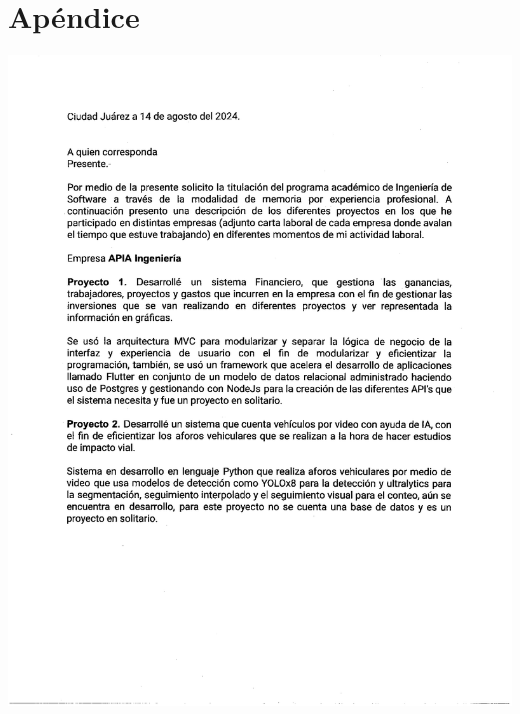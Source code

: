 \documentclass[final, fmstyle, 12pt]{article}
\begin{document}
\section{Apéndice}
\begin{center}
    
\includegraphics[scale=0.8]{Imagenes/Pdf/Carta1.pdf}


\end{center}
\end{document}
